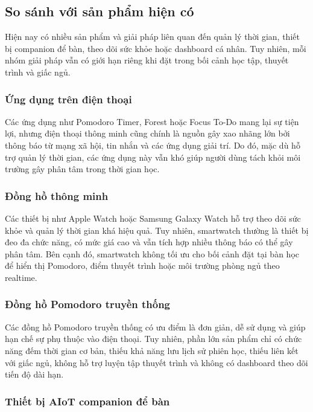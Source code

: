 \documentclass[12pt,a4paper]{article}
\begin{document}
\subsection{So sánh với sản phẩm hiện có}

Hiện nay có nhiều sản phẩm và giải pháp liên quan đến quản lý thời gian, thiết bị companion để bàn, theo dõi sức khỏe hoặc dashboard cá nhân. Tuy nhiên, mỗi nhóm giải pháp vẫn có giới hạn riêng khi đặt trong bối cảnh học tập, thuyết trình và giấc ngủ.

\subsubsection{Ứng dụng trên điện thoại}

Các ứng dụng như Pomodoro Timer, Forest hoặc Focus To-Do mang lại sự tiện lợi, nhưng điện thoại thông minh cũng chính là nguồn gây xao nhãng lớn bởi thông báo từ mạng xã hội, tin nhắn và các ứng dụng giải trí. Do đó, mặc dù hỗ trợ quản lý thời gian, các ứng dụng này vẫn khó giúp người dùng tách khỏi môi trường gây phân tâm trong thời gian học.

\subsubsection{Đồng hồ thông minh}

Các thiết bị như Apple Watch hoặc Samsung Galaxy Watch hỗ trợ theo dõi sức khỏe và quản lý thời gian khá hiệu quả. Tuy nhiên, smartwatch thường là thiết bị đeo đa chức năng, có mức giá cao và vẫn tích hợp nhiều thông báo có thể gây phân tâm. Bên cạnh đó, smartwatch không tối ưu cho bối cảnh đặt tại bàn học để hiển thị Pomodoro, điểm thuyết trình hoặc môi trường phòng ngủ theo realtime.

\subsubsection{Đồng hồ Pomodoro truyền thống}

Các đồng hồ Pomodoro truyền thống có ưu điểm là đơn giản, dễ sử dụng và giúp hạn chế sự phụ thuộc vào điện thoại. Tuy nhiên, phần lớn sản phẩm chỉ có chức năng đếm thời gian cơ bản, thiếu khả năng lưu lịch sử phiên học, thiếu liên kết với giấc ngủ, không hỗ trợ luyện tập thuyết trình và không có dashboard theo dõi tiến độ dài hạn.

\subsubsection{Thiết bị AIoT companion để bàn}
\end{document}
